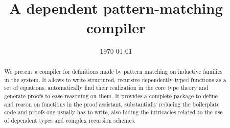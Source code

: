 \documentclass{llncs}
\author{\theauthor}
\date{\today}
\institute{\myaffiliation
  \\\email{\mymail}}
\title{\Equations\\
  A dependent pattern-matching compiler}
\begin{document}
\maketitle

\begin{abstract}
  We present a compiler for definitions made by pattern matching on
  inductive families in the \Coq system. It allows to write structured,
  recursive dependently-typed functions as a set of equations,
  automatically find their realization in the core type theory and
  generate proofs to ease reasoning on them.
  It provides a complete package to define 
  and reason on functions in the proof assistant, substantially
  reducing the boilerplate code and proofs one usually has to write, 
  also hiding the intricacies related to the use of dependent types and
  complex recursion schemes.
\end{abstract}



%


%

  


\end{document}
